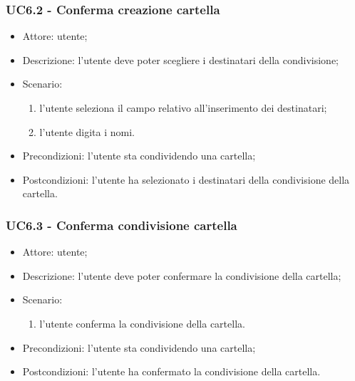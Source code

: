     \subsubsection{UC6.2 - Conferma creazione cartella}
    \begin{itemize}
        \item Attore: utente;
        \item Descrizione: l'utente deve poter scegliere i destinatari della condivisione;
        \item Scenario:
        \begin{enumerate}
        \item l'utente seleziona il campo relativo all'inserimento dei destinatari;
        \item l'utente digita i nomi.
        \end{enumerate}
        \item Precondizioni: l'utente sta condividendo una cartella;
        \item Postcondizioni: l'utente ha selezionato i destinatari della condivisione della cartella.
    \end{itemize}
    
    \subsubsection{UC6.3 - Conferma condivisione cartella}
    \begin{itemize}
        \item Attore: utente;
        \item Descrizione: l'utente deve poter confermare la condivisione della cartella;
        \item Scenario:
        \begin{enumerate}
        \item l'utente conferma la condivisione della cartella.
        \end{enumerate}
        \item Precondizioni: l'utente sta condividendo una cartella;
        \item Postcondizioni: l'utente ha confermato la condivisione della cartella.
    \end{itemize}

